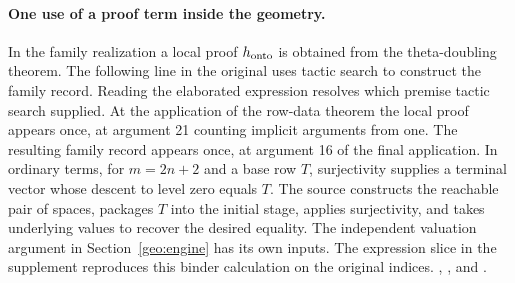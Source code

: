 \paragraph{One use of a proof term inside the geometry.}
In the family realization a local proof \(h_{\rm onto}\) is obtained from the theta-doubling theorem. The following line in the original uses tactic search to construct the family record. Reading the elaborated expression resolves which premise tactic search supplied. At the application of the row-data theorem the local proof appears once, at argument 21 counting implicit arguments from one. The resulting family record appears once, at argument 16 of the final application. In ordinary terms, for \(m=2n+2\) and a base row \(T\), surjectivity supplies a terminal vector whose descent to level zero equals \(T\). The source constructs the reachable pair of spaces, packages \(T\) into the initial stage, applies surjectivity, and takes underlying values to recover the desired equality. The independent valuation argument in Section~\ref{geo:engine} has its own inputs. The expression slice in the supplement reproduces this binder calculation on the original indices. , ,  and .

